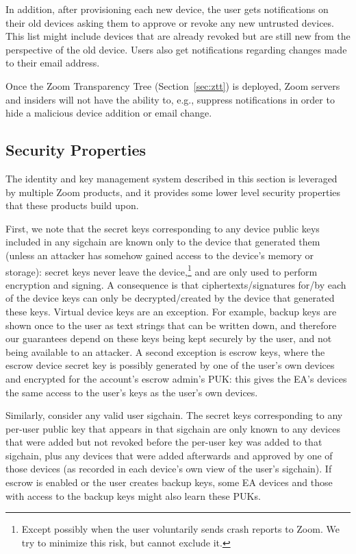 In addition, after provisioning each new device, the user gets notifications on their old devices
asking them to approve or revoke any new untrusted devices. This list might include devices that are
already revoked but are still new from the perspective of the old device. Users also get
notifications regarding changes made to their email address.

Once the Zoom Transparency Tree (Section~\ref{sec:ztt}) is deployed, Zoom servers and insiders will
not have the ability to, e.g., suppress notifications in order to hide a malicious device addition
or email change.





\subsection{Security Properties}
\label{sec:IdKmProps}

The identity and key management system described in this section is leveraged by multiple Zoom
products, and it provides some lower level security properties that these products build upon.

First, we note that the secret keys corresponding to any device public keys included in any sigchain
are known only to the device that generated them (unless an attacker has somehow gained access to
the device's memory or storage): secret keys never leave the device,\footnote{Except possibly when
the user voluntarily sends crash reports to Zoom. We try to minimize this risk, but cannot exclude
it.} and are only used to perform encryption and signing. A consequence is that
ciphertexts/signatures for/by each of the device keys can only be decrypted/created by the device
that generated these keys. Virtual device keys are an exception. For example, backup keys are shown
once to the user as text strings that can be written down, and therefore our guarantees depend on
these keys being kept securely by the user, and not being available to an attacker. A second
exception is escrow keys, where the escrow device secret key is possibly generated by one of the
user's own devices and encrypted for the account's escrow admin's PUK: this gives the EA's devices
the same access to the user's keys as the user's own devices.

Similarly, consider any valid user sigchain. The secret keys corresponding to any per-user public
key that appears in that sigchain are only known to any devices that were added but not revoked
before the per-user key was added to that sigchain, plus any devices that were added afterwards and
approved by one of those devices (as recorded in each device's own view of the user's sigchain). If
escrow is enabled or the user creates backup keys, some EA devices and those with access to the
backup keys might also learn these PUKs.

